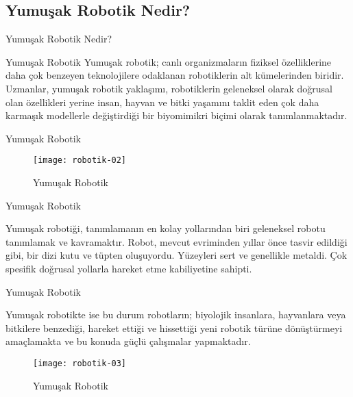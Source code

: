 \documentclass{beamer}
\begin{document}
\subsection{Yumuşak Robotik Nedir?}
\begin{frame}{Yumuşak Robotik Nedir?}
\begin{block}{Yumuşak Robotik}
Yumuşak robotik; canlı organizmaların fiziksel özelliklerine daha çok benzeyen teknolojilere odaklanan robotiklerin alt kümelerinden biridir. Uzmanlar, yumuşak robotik yaklaşımı, robotiklerin geleneksel olarak doğrusal olan özellikleri yerine insan, hayvan ve bitki yaşamını taklit eden çok daha karmaşık modellerle değiştirdiği bir biyomimikri biçimi olarak tanımlanmaktadır.


\end{block}
\end{frame}

\begin{frame}{Yumuşak Robotik}
\begin{figure}
\texttt{[image: robotik-02]}
\caption{\label{Şekil-2} Yumuşak Robotik}
\end{figure}
\end{frame}
\begin{frame}{Yumuşak Robotik}
 \begin{block}
 \item Yumuşak robotiği, tanımlamanın en kolay yollarından biri geleneksel robotu tanımlamak ve kavramaktır. Robot, mevcut evriminden yıllar önce tasvir edildiği gibi, bir dizi kutu ve tüpten oluşuyordu. Yüzeyleri sert ve genellikle metaldi. Çok spesifik doğrusal yollarla hareket etme kabiliyetine sahipti. 
  \end{block}
\end{frame}

\begin{frame}{Yumuşak Robotik}
\begin{block}
\item Yumuşak robotikte ise bu durum robotların; biyolojik insanlara, hayvanlara veya bitkilere benzediği, hareket ettiği ve hissettiği yeni robotik türüne dönüştürmeyi amaçlamakta ve bu konuda güçlü çalışmalar yapmaktadır. 
\end{block}
\begin{figure}
\texttt{[image: robotik-03]}
\caption{\label{Şekil-3} Yumuşak Robotik}
\end{figure}
\end{frame}
\end{document}
